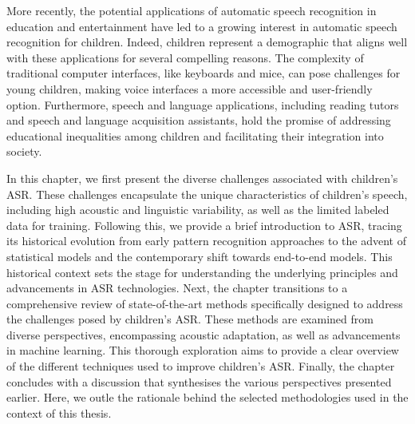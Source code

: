 More recently, the potential applications of automatic speech recognition in education and entertainment have led to a growing interest in automatic speech recognition for children. Indeed, children represent a demographic that aligns well with these applications for several compelling reasons. The complexity of traditional computer interfaces, like keyboards and mice, can pose challenges for young children, making voice interfaces a more accessible and user-friendly option. Furthermore, speech and language applications, including reading tutors and speech and language acquisition assistants, hold the promise of addressing educational inequalities among children and facilitating their integration into society.

In this chapter, we first present the diverse challenges associated with children's ASR. These challenges encapsulate the unique characteristics of children's speech, including high acoustic and linguistic variability, as well as the limited labeled data for training. Following this, we provide a brief introduction to ASR, tracing its historical evolution from early pattern recognition approaches to the advent of statistical models and the contemporary shift towards end-to-end models. This historical context sets the stage for understanding the underlying principles and advancements in ASR technologies. Next, the chapter transitions to a comprehensive review of state-of-the-art methods specifically designed to address the challenges posed by children's ASR. These methods are examined from diverse perspectives, encompassing acoustic adaptation, as well as advancements in machine learning. This thorough exploration aims to provide a clear overview of the different techniques used to improve children's ASR. Finally, the chapter concludes with a discussion that synthesises the various perspectives presented earlier. Here, we outle the rationale behind the selected methodologies used in the context of this thesis.


